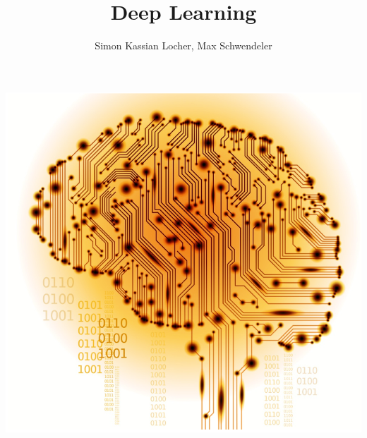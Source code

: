 \documentclass{scrartcl}
\title{Deep Learning}
\author{Simon Kassian Locher, Max Schwendeler}
\begin{document}

\lstset{language=Python}
\lstset{style=Python}

\begin{titlepage}
	{\scshape \maketitle}
	\centering
	\begin{minipage}{18cm}
		\centering
		\includegraphics[width=0.95\linewidth]{header/cnn.png}
	\end{minipage}
\end{titlepage}

\setcounter{tocdepth}{2}
\tableofcontents
\newpage












\end{document}
